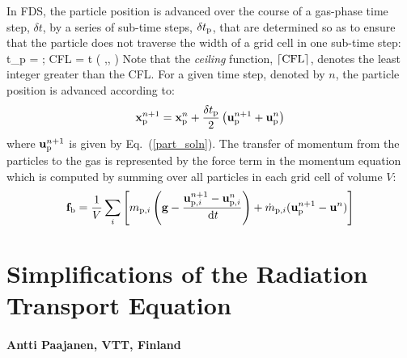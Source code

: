 In FDS, the particle position is advanced over the course of a gas-phase time step, $\delta t$, by a series of sub-time steps, $\delta t_{\rm p}$, that are determined so as to ensure that the particle does not traverse the width of a grid cell in one sub-time step:
\be
   \delta t_{\rm p} =  \quad ; \quad \hbox{CFL} = \delta t \max \left( ,, \right)
\ee
Note that the {\em ceiling} function, $\lceil \hbox{CFL} \rceil$, denotes the least integer greater than the CFL. For a given time step, denoted by $n$, the particle position is advanced according to:
\begin{equation}
    \mathbf{x}_{\rm p}^{n+1} = \mathbf{x}_{\rm p}^n + \frac{\delta t_{\rm p}}{2} \left( \mathbf{u}_{\rm p}^{n+1} + \mathbf{u}_{\rm p}^n \right)
\end{equation}
where $\mathbf{u}_{\rm p}^{n+1}$ is given by Eq.~(\ref{part_soln}). The transfer of momentum from the particles to the gas is represented by the force term in the momentum equation which is computed by summing over all particles in each grid cell of volume $V$:
\begin{equation}
   \mathbf{f}_{\rm b} = \frac{1}{V} \sum_i \left[ m_{{\rm p},i} \left( {\mathbf{g}} - \frac{{\mathbf{u}}_{{\rm p},i}^{n+1}-{\mathbf{u}}_{{\rm p},i}^n}{\,\mathrm{d} t} \right) + \dot{m}_{{\rm p},i}  (\mathbf{u}_{\rm p}^{n+1} - \mathbf{u}^n) \right]
\end{equation}




\chapter{Simplifications of the Radiation Transport Equation}
\label{radiation_derivations}

\subsubsection*{Antti Paajanen, VTT, Finland}


